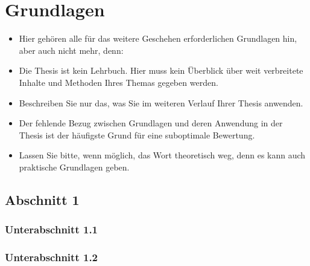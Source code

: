 
\chapter{Grundlagen} %

\label{Chapter2}

\begin{itemize}
  \item Hier gehören alle für das weitere Geschehen erforderlichen Grundlagen hin, aber auch nicht mehr, denn:
  \item Die Thesis ist kein Lehrbuch. Hier muss kein Überblick über weit verbreitete Inhalte und Methoden Ihres Themas gegeben werden.
  \item Beschreiben Sie nur das, was Sie im weiteren Verlauf Ihrer Thesis anwenden.
  \item Der fehlende Bezug zwischen Grundlagen und deren Anwendung in der Thesis ist der häufigste Grund für eine suboptimale Bewertung.
  \item Lassen Sie bitte, wenn möglich, das Wort theoretisch weg, denn es kann auch praktische Grundlagen geben.
\end{itemize}

\section{Abschnitt 1}

\subsection{Unterabschnitt 1.1}



\subsection{Unterabschnitt 1.2}



